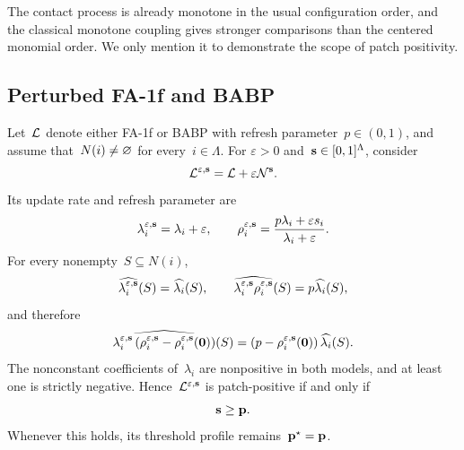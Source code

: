 \documentclass[EJP,preprint,NODS,nobera]{ejpecp}
\begin{document}
The contact process is already monotone in the usual configuration order, and
the classical monotone coupling gives stronger comparisons than the centered
monomial order. We only mention it to demonstrate the scope of patch
positivity.

\subsection{Perturbed FA-1f and BABP}
\label{subsec:perturbed-fa-babp}

Let~$\mathcal{L}$ denote either FA-1f or BABP with refresh parameter~$p\in(0,1)$,
and assume that~$N(i)\neq\varnothing$ for every~$i\in\Lambda$. For
$\varepsilon>0$ and~$\mathbf{s}\in[0,1]^\Lambda$, consider
\begin{equation*}
\mathcal{L}^{\varepsilon,\mathbf{s}}
=
\mathcal{L}+\varepsilon\mathcal{N}^{\mathbf{s}}.
\end{equation*}
Its update rate and refresh parameter are
\begin{equation*}
\lambda_i^{\varepsilon,\mathbf{s}}
=
\lambda_i+\varepsilon,
\qquad
\rho_i^{\varepsilon,\mathbf{s}}
=
\frac{p\lambda_i+\varepsilon s_i}
{\lambda_i+\varepsilon}.
\end{equation*}
For every nonempty~$S\subseteq N(i)$,
\begin{equation*}
\widehat{\lambda_i^{\varepsilon,\mathbf{s}}}(S)
=
\widehat{\lambda_i}(S),
\qquad
\widehat{\lambda_i^{\varepsilon,\mathbf{s}}
\rho_i^{\varepsilon,\mathbf{s}}}(S)
=
p\widehat{\lambda_i}(S),
\end{equation*}
and therefore
\begin{equation*}
\widehat{\lambda_i^{\varepsilon,\mathbf{s}}
\left(\rho_i^{\varepsilon,\mathbf{s}}
-\rho_i^{\varepsilon,\mathbf{s}}(\mathbf{0})\right)}(S)
=
\left(p-\rho_i^{\varepsilon,\mathbf{s}}(\mathbf{0})\right)
\widehat{\lambda_i}(S).
\end{equation*}
The nonconstant coefficients of~$\lambda_i$ are nonpositive in both models,
and at least one is strictly negative. Hence~$\mathcal{L}^{\varepsilon,\mathbf{s}}$ is
patch-positive if and only if
\begin{equation}
\label{eq:perturbed-fa-babp-patch-positive}
\mathbf{s}\geq\mathbf{p}.
\end{equation}
Whenever this holds, its threshold profile remains~$\mathbf{p}^\star=\mathbf{p}$.
\end{document}
